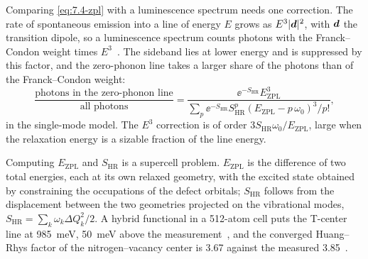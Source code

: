 Comparing \cref{eq:7.4-zpl} with a luminescence spectrum needs one correction. The rate of spontaneous emission into a line of energy $E$ grows as $E^3|\bm{d}|^2$, with $\bm{d}$ the transition dipole, so a luminescence spectrum counts photons with the Franck--Condon weight times $E^3$~\cite[Eq.~(2)]{alkauskas2014first}. The sideband lies at lower energy and is suppressed by this factor, and the zero-phonon line takes a larger share of the photons than of the Franck--Condon weight:
\begin{equation}
  \frac{\text{photons in the zero-phonon line}}{\text{all photons}} = \frac{\ee^{-S_{\mathrm{HR}}}E_{\mathrm{ZPL}}^3}{\sum_p\ee^{-S_{\mathrm{HR}}}S_{\mathrm{HR}}^p(E_{\mathrm{ZPL}} - p\,\omega_0)^3/p!} ,
  \label{eq:7.4-photon}
\end{equation}
in the single-mode model. The $E^3$ correction is of order $3S_{\mathrm{HR}}\omega_0/E_{\mathrm{ZPL}}$, large when the relaxation energy is a sizable fraction of the line energy.

Computing $E_{\mathrm{ZPL}}$ and $S_{\mathrm{HR}}$ is a supercell problem. $E_{\mathrm{ZPL}}$ is the difference of two total energies, each at its own relaxed geometry, with the excited state obtained by constraining the occupations of the defect orbitals; $S_{\mathrm{HR}}$ follows from the displacement between the two geometries projected on the vibrational modes, $S_{\mathrm{HR}} = \sum_k\omega_k\Delta Q_k^2/2$. A hybrid functional in a 512-atom cell puts the T-center line at \SI{985}{meV}, \SI{50}{meV} above the measurement~\cite{dhaliah2022first}, and the converged Huang--Rhys factor of the nitrogen--vacancy center is 3.67 against the measured 3.85~\cite[Sects.~4.2 and~4.3]{alkauskas2014first}.

